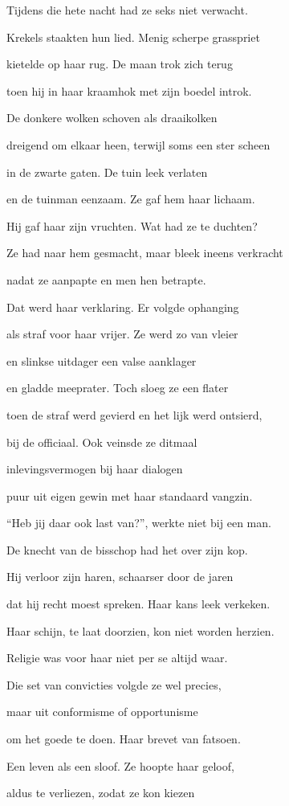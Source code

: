 Tijdens die hete nacht
had ze seks niet verwacht.

Krekels staakten hun lied.
Menig scherpe grasspriet

kietelde op haar rug.
De maan trok zich terug

toen hij in haar kraamhok
met zijn boedel introk.

De donkere wolken
schoven als draaikolken

dreigend om elkaar heen,
terwijl soms een ster scheen

in de zwarte gaten.
De tuin leek verlaten

en de tuinman eenzaam.
Ze gaf hem haar lichaam.

Hij gaf haar zijn vruchten.
Wat had ze te duchten?

Ze had naar hem gesmacht,
maar bleek ineens verkracht

nadat ze aanpapte
en men hen betrapte.

Dat werd haar verklaring.
Er volgde ophanging

als straf voor haar vrijer.
Ze werd zo van vleier

en slinkse uitdager
een valse aanklager

en gladde meeprater.
Toch sloeg ze een flater

toen de straf werd gevierd
en het lijk werd ontsierd,

bij de officiaal.
Ook veinsde ze ditmaal

inlevingsvermogen
bij haar dialogen

puur uit eigen gewin
met haar standaard vangzin.

“Heb jij daar ook last van?”,
werkte niet bij een man.

De knecht van de bisschop
had het over zijn kop.

Hij verloor zijn haren,
schaarser door de jaren

dat hij recht moest spreken.
Haar kans leek verkeken.

Haar schijn, te laat doorzien,
kon niet worden herzien.

Religie was voor haar
niet per se altijd waar.

Die set van convicties
volgde ze wel precies,

maar uit conformisme
of opportunisme

om het goede te doen.
Haar brevet van fatsoen.

Een leven als een sloof.
Ze hoopte haar geloof,

aldus te verliezen,
zodat ze kon kiezen


